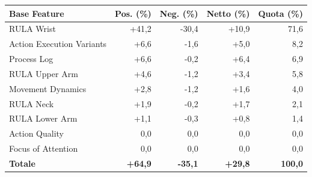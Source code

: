 \begin{tabular*}{\linewidth}{@{}l@{\extracolsep{\fill}}rrrr@{}}
\toprule
\textbf{Base Feature} & \textbf{Pos. (\%)} & \textbf{Neg. (\%)} & \textbf{Netto (\%)} & \textbf{Quota (\%)} \\
\midrule
RULA Wrist & +41{,}2 & -30{,}4 & +10{,}9 & 71{,}6 \\
Action Execution Variants & +6{,}6 & -1{,}6 & +5{,}0 & 8{,}2 \\
Process Log & +6{,}6 & -0{,}2 & +6{,}4 & 6{,}9 \\
RULA Upper Arm & +4{,}6 & -1{,}2 & +3{,}4 & 5{,}8 \\
Movement Dynamics & +2{,}8 & -1{,}2 & +1{,}6 & 4{,}0 \\
RULA Neck & +1{,}9 & -0{,}2 & +1{,}7 & 2{,}1 \\
RULA Lower Arm & +1{,}1 & -0{,}3 & +0{,}8 & 1{,}4 \\
Action Quality & 0{,}0 & 0{,}0 & 0{,}0 & 0{,}0 \\
Focus of Attention & 0{,}0 & 0{,}0 & 0{,}0 & 0{,}0 \\
\midrule
\textbf{Totale} & \textbf{+64{,}9} & \textbf{-35{,}1} & \textbf{+29{,}8} & \textbf{100{,}0} \\
\bottomrule
\end{tabular*}

